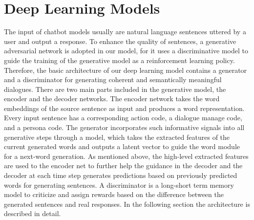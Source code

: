 \section{Deep Learning Models}

The input of chatbot models usually are natural language sentences uttered by a user and output a response. To enhance the quality of sentences, a generative adversarial network is adopted in our model, for it uses a discriminative model to guide the training of the generative model as a reinforcement learning policy. Therefore, the basic architecture of our deep learning model contains a generator and a discriminator for generating coherent and semantically meaningful dialogues. There are two main parts included in the generative model, the encoder and the decoder networks. The encoder network takes the word embeddings of the source sentence as input and produces a word representation. Every input sentence has a corresponding action code, a dialogue manage code, and a persona code. The generator incorporates such informative signals into all generative steps through a model, which takes the extracted features of the current generated words and outputs a latent vector to guide the word module for a next-word generation. As mentioned above, the high-level extracted features are used to the encoder net to further help the guidance in the decoder and the decoder at each time step generates predictions based on previously predicted words for generating sentences. A discriminator is a long-short term memory model to criticize and assign rewards based on the difference between the generated sentences and real responses. In the following section the architecture is described in detail.

